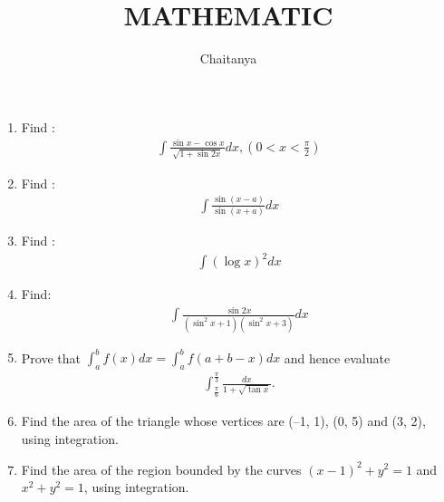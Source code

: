 \documentclass[12pt,-letter paper]{article}
\title{\textbf{MATHEMATIC}}
\author{Chaitanya}
\begin{document}
\maketitle
\begin{enumerate}
\section{\textbf{Integrations}}
\item Find :
\begin{align*}
    \int \frac{\sin x- \cos x}{\sqrt{1 + \sin 2x}}dx, (0 < x<\frac{\pi}{2})
\end{align*}
\item Find : 
\begin{align*}
\int \frac{\sin(x-a) }{\sin(x+a)}dx
\end{align*}
\item Find :
\begin{align*}
\int (\log x)^2 dx
\end{align*}
\item Find:
\begin{align*}
	\int\frac{\sin 2x}{(\sin^{2}x + 1)(\sin^{2}x + 3)}dx
\end{align*}
\item Prove that $\int_{a}^{b} f(x) dx = \int_{a}^{b} f(a + b - x)dx$ and hence evaluate 
\begin{align*}		
\int_{\frac{\pi}{6}}^{\frac{\pi}{3}} \frac{dx}{1 + \sqrt{\tan x}}.
\end{align*}
\item Find the area of the triangle whose vertices are (–1, 1), (0, 5) and (3, 2), using integration.
\item Find the area of the region bounded by the curves $(x - 1)^{2} + y^{2} = 1$ and $x^{2} + y^{2} = 1$, using integration.
\end{enumerate}
\end{document}
